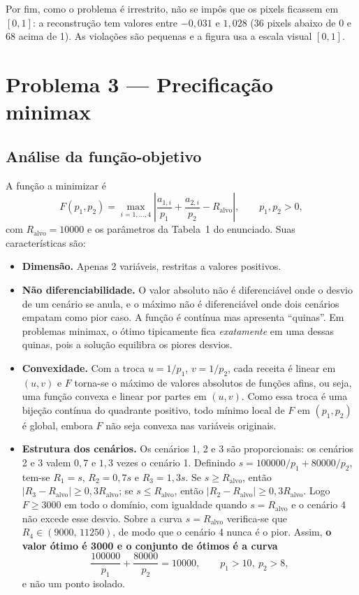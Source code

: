 \documentclass[12pt,a4paper]{article}
\begin{document}
Por fim, como o problema é irrestrito, não se impôs que os pixels ficassem em $[0,1]$: a reconstrução tem valores entre $-0{,}031$ e $1{,}028$ (36 pixels abaixo de 0 e 68 acima de 1). As violações são pequenas e a figura usa a escala visual $[0,1]$.

\section{Problema 3 --- Precificação minimax}

\subsection{Análise da função-objetivo}

A função a minimizar é
\begin{equation}
F(p_1,p_2) = \max_{i=1,\dots,4} \left|\frac{a_{1,i}}{p_1}+\frac{a_{2,i}}{p_2} - R_{\mathrm{alvo}}\right|, \qquad p_1,p_2>0,
\end{equation}
com $R_{\mathrm{alvo}}=10000$ e os parâmetros da Tabela~1 do enunciado. Suas características são:

\begin{itemize}
  \item \textbf{Dimensão.} Apenas 2 variáveis, restritas a valores positivos.
  \item \textbf{Não diferenciabilidade.} O valor absoluto não é diferenciável onde o desvio de um cenário se anula, e o máximo não é diferenciável onde dois cenários empatam como pior caso. A função é contínua mas apresenta ``quinas''. Em problemas minimax, o ótimo tipicamente fica \emph{exatamente} em uma dessas quinas, pois a solução equilibra os piores desvios.
  \item \textbf{Convexidade.} Com a troca $u=1/p_1$, $v=1/p_2$, cada receita é linear em $(u,v)$ e $F$ torna-se o máximo de valores absolutos de funções afins, ou seja, uma função convexa e linear por partes em $(u,v)$. Como essa troca é uma bijeção contínua do quadrante positivo, todo mínimo local de $F$ em $(p_1,p_2)$ é global, embora $F$ não seja convexa nas variáveis originais.
  \item \textbf{Estrutura dos cenários.} Os cenários 1, 2 e 3 são proporcionais: os cenários 2 e 3 valem $0{,}7$ e $1{,}3$ vezes o cenário 1. Definindo $s = 100000/p_1 + 80000/p_2$, tem-se $R_1=s$, $R_2=0{,}7s$ e $R_3=1{,}3s$. Se $s\ge R_{\mathrm{alvo}}$, então $|R_3-R_{\mathrm{alvo}}|\ge 0{,}3R_{\mathrm{alvo}}$; se $s\le R_{\mathrm{alvo}}$, então $|R_2-R_{\mathrm{alvo}}|\ge 0{,}3R_{\mathrm{alvo}}$. Logo $F\ge 3000$ em todo o domínio, com igualdade quando $s=R_{\mathrm{alvo}}$ e o cenário 4 não excede esse desvio. Sobre a curva $s=R_{\mathrm{alvo}}$ verifica-se que $R_4\in(9000,\,11250)$, de modo que o cenário 4 nunca é o pior. Assim, \textbf{o valor ótimo é 3000 e o conjunto de ótimos é a curva}
  \begin{equation}
  \frac{100000}{p_1}+\frac{80000}{p_2} = 10000, \qquad p_1>10,\ p_2>8,
  \end{equation}
  e não um ponto isolado.
\end{itemize}
\end{document}

